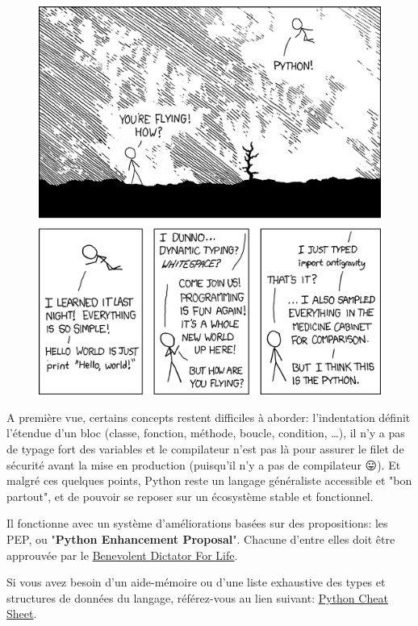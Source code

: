 \documentclass[11pt]{amsbook}
\begin{document}
\begin{figure}[h]{}
\centering\includegraphics[width=2.5truein]{images/xkcd-353-python.png}
\caption{}

\end{figure}

A première vue, certains concepts restent difficiles à aborder: l’indentation définit l’étendue d’un bloc (classe, fonction, méthode, boucle, condition, …​), il n’y a pas de typage fort des variables et le compilateur n’est pas là pour assurer le filet de sécurité avant la mise en production (puisqu’il n’y a pas de compilateur 😛).
Et malgré ces quelques points, Python reste un langage généraliste accessible et "bon partout", et de pouvoir se reposer sur un écosystème stable et fonctionnel.


Il fonctionne avec un système d’améliorations basées sur des propositions: les PEP, ou "\textbf{Python Enhancement Proposal}".
Chacune d’entre elles doit être approuvée par le \href{http://fr.wikipedia.org/wiki/Benevolent_Dictator_for_Life}{Benevolent Dictator For Life}.


Si vous avez besoin d’un aide-mémoire ou d’une liste exhaustive des types et structures de données du langage, référez-vous au lien suivant: \href{https://gto76.github.io/python-cheatsheet/}{Python Cheat Sheet}.
\end{document}
